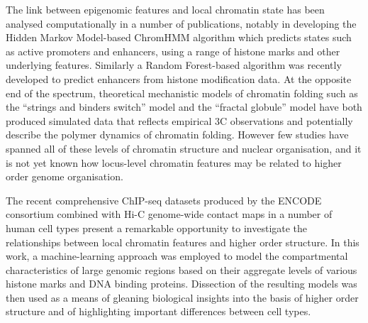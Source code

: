 \documentclass[a4paper]{report}
\begin{document}
The link between epigenomic features and local chromatin state has been
analysed computationally in a number of publications, notably in
developing the
Hidden Markov Model-based ChromHMM\cite{Ernst2012} algorithm which predicts states such as active promoters and enhancers, using a
range of histone marks and other underlying features.\cite{Ernst2011} Similarly a Random Forest-based
algorithm was recently developed to predict enhancers from histone
modification data.\cite{Rajagopal2013} At the opposite end of the
spectrum, theoretical mechanistic models of chromatin folding such as the
``strings and binders switch'' model\cite{Barbieri2012} and the ``fractal
globule'' model\cite{Lieberman2011, Mirny2011, Grosberg1988a} have both produced simulated data
that reflects empirical 3C observations and potentially describe the polymer
dynamics of chromatin folding. However few studies have spanned all of
these levels of chromatin structure and nuclear organisation, and it is not yet known how locus-level chromatin features may
be related to higher order genome organisation. 

The recent comprehensive ChIP-seq datasets
produced by the ENCODE consortium\cite{Dunham2012} combined with Hi-C
genome-wide contact maps in a number of human cell
types\cite{Dixon2012, Lieberman2011, Kalhor2012} present a remarkable
opportunity to investigate the relationships between local
chromatin features and higher order structure. In this work, a
machine-learning approach was employed to model the
compartmental characteristics of large genomic regions based on their
aggregate levels of various histone marks and DNA binding
proteins. Dissection of the resulting models was then used as a
means of gleaning biological insights into the basis of higher order
structure and of highlighting important differences between cell types.
\end{document}
